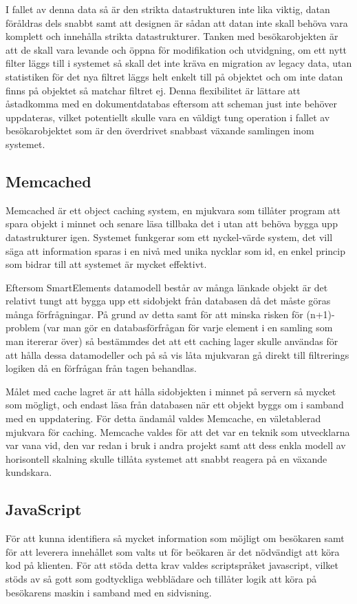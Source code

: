 I fallet av denna data så är den strikta datastrukturen inte lika viktig, datan föråldras dels snabbt samt att designen är sådan att datan inte skall behöva vara komplett och innehålla strikta datastrukturer. Tanken med besökarobjekten är att de skall vara levande och öppna för modifikation och utvidgning, om ett nytt filter läggs till i systemet så skall det inte kräva en migration av legacy data, utan statistiken för det nya filtret läggs helt enkelt till på objektet och om inte datan finns på objektet så matchar filtret ej. Denna flexibilitet är lättare att åstadkomma med en dokumentdatabas eftersom att scheman just inte behöver uppdateras, vilket potentiellt skulle vara en väldigt tung operation i fallet av besökarobjektet som är den överdrivet snabbast växande samlingen inom systemet.

\subsection{Memcached}

Memcached är ett object caching system, en mjukvara som tillåter program att spara objekt i minnet och senare läsa tillbaka det i utan att behöva bygga upp datastrukturer igen. Systemet funkgerar som ett nyckel-värde system, det vill säga att information sparas i en nivå med unika nycklar som id, en enkel princip som bidrar till att systemet är mycket effektivt. \citep{memcachedwiki}

Eftersom SmartElements datamodell består av många länkade objekt är det relativt tungt att bygga upp ett sidobjekt från databasen då det måste göras många förfrågningar. På grund av detta samt för att minska risken för (n+1)-problem (var man gör en databasförfrågan för varje element i en samling som man itererar över) så bestämmdes det att ett caching lager skulle användas för att hålla dessa datamodeller och på så vis låta mjukvaran gå direkt till filtrerings logiken då en förfrågan från tagen behandlas.

Målet med cache lagret är att hålla sidobjekten i minnet på servern så mycket som mögligt, och endast läsa från databasen när ett objekt byggs om i samband med en uppdatering. För detta ändamål valdes Memcache, en väletablerad mjukvara för caching. Memcache valdes för att det var en teknik som utvecklarna var vana vid, den var redan i bruk i andra projekt samt att dess enkla modell av horisontell skalning skulle tillåta systemet att snabbt reagera på en växande kundskara.

\subsection{JavaScript}

För att kunna identifiera så mycket information som möjligt om besökaren samt för att leverera innehållet som valts ut för beökaren är det nödvändigt att köra kod på klienten. För att stöda detta krav valdes scriptspråket javascript, vilket stöds av så gott som godtyckliga webblädare och tillåter logik att köra på besökarens maskin i samband med en sidvisning.

